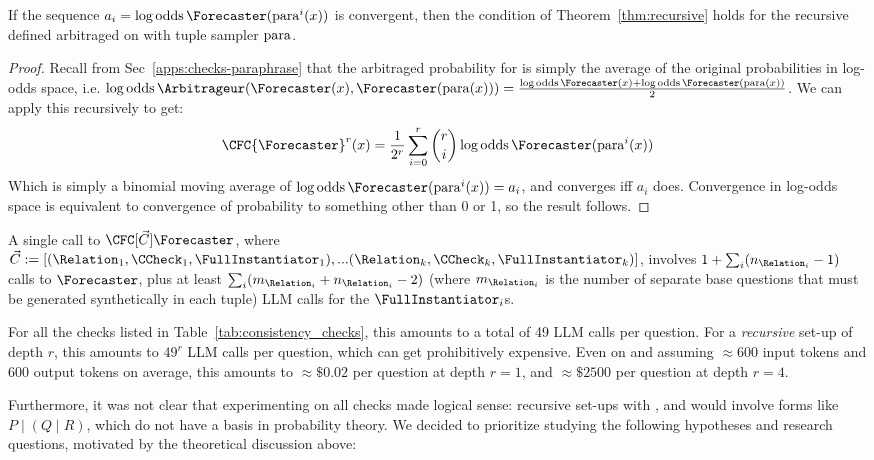 \begin{theorem}
If the sequence $a_i=\logodds\Forecaster(\para^i(x))$ is convergent, then the condition of Theorem~\ref{thm:recursive} holds for the recursive \CFCaster{} defined arbitraged on \ParaphraseChecker{} with tuple sampler $\operatorname{para}$.
\end{theorem}
\begin{proof}
Recall from Sec~\ref{apps:checks-paraphrase} that the arbitraged probability for \ParaphraseChecker{} is simply the average of the original probabilities in log-odds space, i.e. $\logodds\Arbitrageur(\Forecaster(x),\Forecaster(\para(x)))=\frac{\logodds\Forecaster(x)+\logodds\Forecaster(\para(x))}{2}$. We can apply this recursively to get:
\begin{equation*}
\CFC{\Forecaster}^r(x)=\frac{1}{2^r}\sum_{i=0}^r{\binom{r}{i}\logodds\Forecaster(\para^i(x))}
\end{equation*}
Which is simply a binomial moving average of $\logodds\Forecaster(\para^i(x))=a_i$, and converges iff $a_i$ does. Convergence in log-odds space is equivalent to convergence of probability to something other than 0 or 1, so the result follows.
\end{proof}

\label{cfc/app:cfcaster-cost}
A single call to $\CFC[\vec{C}]{\Forecaster}$, where $\vec{C}:=[(\Relation_1,\CCheck_1,\FullInstantiator_1),...(\Relation_k,\CCheck_k,\FullInstantiator_k)]$, involves $1+\sum_i (n_{\Relation_i}-1)$ calls to $\Forecaster$, plus at least $\sum_i(m_{\Relation_i}+n_{\Relation_i}-2)$ (where $m_{\Relation_i}$ is the number of separate base questions that must be generated synthetically in each tuple) LLM calls for the $\FullInstantiator_i$s.

For all the checks listed in Table~\ref{tab:consistency_checks}, this amounts to a total of 49 LLM calls per question. For a \emph{recursive} \CFCaster{} set-up of depth $r$, this amounts to $49^r$ LLM calls per question, which can get prohibitively expensive. Even on \gptfouromini{} and assuming $\approx 600$ input tokens and 600 output tokens on average, this amounts to $\approx\$0.02$ per question at depth $r=1$, and $\approx\$2500$ per question at depth $r=4$.

Furthermore, it was not clear that experimenting on all checks made logical sense: recursive \CFCaster{} set-ups with \CondChecker{}, \CondCondChecker{} and \ExpectedEvidenceChecker{} would involve forms like $P\mid(Q\mid R)$, which do not have a basis in probability theory. We decided to prioritize studying the following hypotheses and research questions, motivated by the theoretical discussion above:


